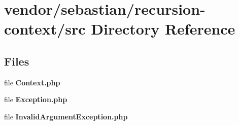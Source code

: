 \section{vendor/sebastian/recursion-\/context/src Directory Reference}
\label{dir_90b6a685cd83cccab6b1e3a841647b17}
\subsection*{Files}
\begin{DoxyCompactItemize}
\item 
file {\bf Context.\+php}
\item 
file {\bf Exception.\+php}
\item 
file {\bf Invalid\+Argument\+Exception.\+php}
\end{DoxyCompactItemize}
